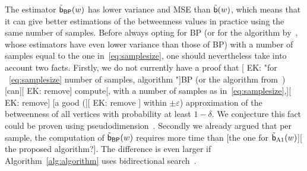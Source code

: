 %
%
%
%

The estimator $\tilde{\mathsf{b}}_{\mathsf{BP}}(w)$ has lower variance and MSE than
$\tilde{\mathsf{b}}(w)$, which means that it can give better estimations of the
betweenness values in practice using the same number of samples. Before always
opting for \textsf{BP} (or for the algorithm by~\citet{GeisbergerSS08}, whose
estimators have even lower variance than those of \textsf{BP}) with a number of
samples equal to the one in~\eqref{eq:samplesize}, one should
nevertheless take into account two facts. Firstly, we do not currently have a
proof that [ EK: "for ~\eqref{eq:samplesize} number of samples, algorithm "]\textsf{BP} (or the algorithm from~\citep{GeisbergerSS08}) [can][ EK: remove] 
compute[, with a number of samples as in~\eqref{eq:samplesize},][ EK: remove]
[a good (][ EK: remove ] within $\pm\varepsilon$) approximation of the betweenness of all
vertices with probability at least $1-\delta$. We conjecture this fact could be
proven using pseudodimension~\citep[Chap.~11]{AnthonyB99}. Secondly we already
argued that per sample, the computation of $\tilde{\mathsf{b}}_{\mathsf{BP}}(w)$
requires more time than [the one for $\tilde{\mathsf{b}}_{\mathrm{A1}}(w)$][ the proposed algorithm?]. The
difference is even larger if Algorithm~\ref{alg:algorithm} uses bidirectional
search~\citep{KaindlK97,Pohl69}. 

